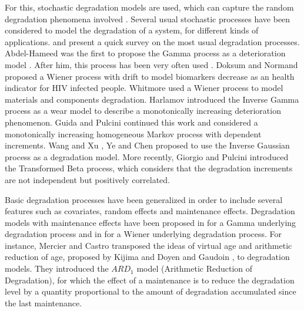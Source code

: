 For this, stochastic degradation models are used, which can capture the random degradation phenomena involved \cite{jonge_review_2020}.
Several usual stochastic processes have been considered to model the degradation of a system, for different kinds of applications.
\cite{ye_stochastic_2015} and \cite{kahle_degradation_2016} present a quick survey on the most usual degradation processes.
Abdel-Hameed was the first to propose the Gamma process as a deterioration model \cite{abdel-hameed_gamma_1975}. After him, this process has been very often used \cite{grall_continuous-time_2002,lawless_covariates_2004, van_noortwijk_survey_2009}.
Doksum and Normand \cite{doksum_gaussian_1995} proposed a Wiener process with drift to model biomarkers decrease as an health indicator for HIV infected people. Whitmore \cite{whitmore_estimating_1995} used a Wiener process to model materials and components degradation. 
Harlamov \cite{harlamov_statistics_2006} introduced the Inverse Gamma process as a wear model to describe a monotonically increasing deterioration phenomenon. Guida and Pulcini \cite{guida_inverse_2013} continued this work and considered a monotonically increasing homogeneous Markov process with dependent increments. 
Wang and Xu \cite{wang_inverse_2010}, Ye and Chen \cite{ye_inverse_2014} proposed to use the Inverse Gaussian process as a degradation model.
More recently, Giorgio and Pulcini \cite{giorgio_new_2018} introduced the Transformed Beta process, which considers that the degradation increments are not independent but  positively correlated. 

Basic degradation processes have been generalized in order to include several features such as covariates, random effects and maintenance effects. Degradation models with maintenance effects have been proposed in \cite{van_condition-based_2012, mercier_stochastic_2019} for a Gamma underlying degradation process and in \cite{kahle_wiener_2010, zhang_degradation-based_2015, kahle_imperfect_2019, wang_modeling_2020} for a Wiener underlying degradation process.
For instance, Mercier and Castro  \cite{mercier_stochastic_2019} transposed the ideas of virtual age and arithmetic reduction of age, proposed by Kijima \cite{kijima_results_1989} and Doyen and Gaudoin \cite{doyen_classes_2004}, to degradation models. They introduced the $ARD_1$ model (Arithmetic Reduction of Degradation), for which the effect of a maintenance is to reduce the degradation level by a quantity proportional to the amount of degradation accumulated since the last maintenance.

